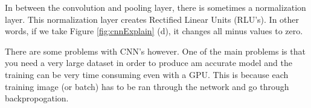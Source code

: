 In between the convolution and pooling layer, there is sometimes a normalization
layer. This normalization layer creates Rectified Linear Units (RLU's). In other
words, if we take Figure \ref{fig:cnnExplain} (d), it changes all minus values to
zero.

There are some problems with CNN's however. One of the main problems is that you
need a very large dataset in order to produce am accurate model and the training
can be very time consuming even with a GPU.
This is because each training image (or batch) has to be ran through the network and go through backpropogation.